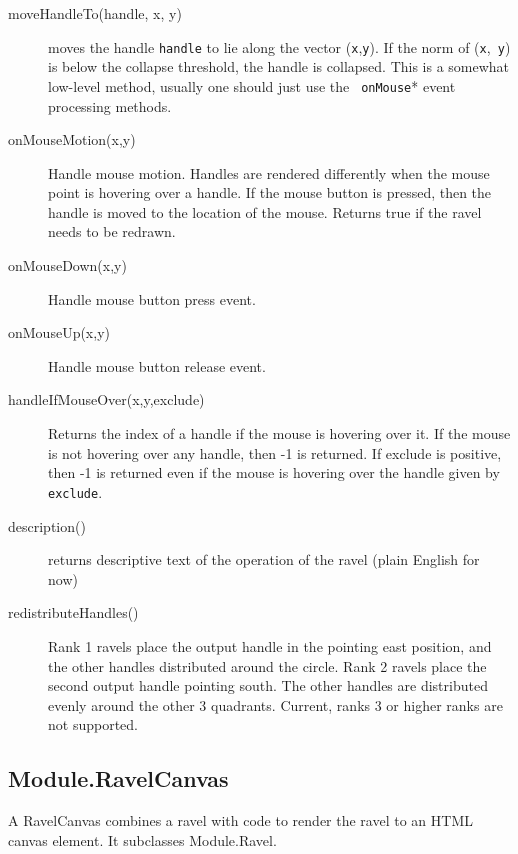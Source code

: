 \documentclass{article}
\begin{document}
\begin{description}
\begin{description}
  \item[moveHandleTo(handle, x, y)] moves the handle {\tt handle} to
    lie along the vector ({\tt x},{\tt y}). If the norm of ({\tt x},{\tt
      y}) is below the collapse threshold, the handle is collapsed. This is
    a somewhat low-level method, usually one should just use the {\tt
      onMouse}* event processing methods.
    
  \item[onMouseMotion(x,y)] Handle mouse motion. Handles are rendered
    differently when the mouse point is hovering over a
    handle. If the mouse button is pressed, then the handle is moved
    to the location of the mouse. Returns true if the ravel needs to be redrawn.
  \item[onMouseDown(x,y)] Handle mouse button press event.
  \item[onMouseUp(x,y)] Handle mouse button release event.
    
  \item[handleIfMouseOver(x,y,exclude)] Returns the index of a handle if
    the mouse is hovering over it. If the mouse is not hovering over any
    handle, then -1 is returned. If exclude is positive, then -1 is
    returned even if the mouse is hovering over the handle given by {\tt
      exclude}.

  \item[description()] returns descriptive text of the operation of the
    ravel (plain English for now)
    
  \item[redistributeHandles()] Rank 1 ravels place the output handle in
    the pointing east position, and the other handles distributed around
    the circle. Rank 2 ravels place the second output handle pointing
    south. The other handles are distributed evenly around the other 3
    quadrants. Current, ranks 3 or higher ranks are not supported.
    
  \end{description} 
\end{description} 

\subsection{Module.RavelCanvas}

A RavelCanvas combines a ravel with code to render the ravel to an
HTML canvas element. It subclasses Module.Ravel.
\end{document}
